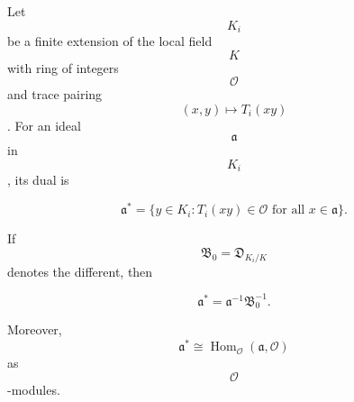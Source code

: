 Let $$K_i$$ be a finite extension of the local field $$K$$ with ring of integers $$\mathcal{O}$$ and trace pairing $$(x,y) \mapsto T_i(xy)$$. For an ideal $$\mathfrak{a}$$ in $$K_i$$, its dual is

$$\mathfrak{a}^* = \{ y \in K_i : T_i(xy) \in \mathcal{O} \text{ for all } x \in \mathfrak{a} \}.$$

If $$\mathfrak{B}_0 = \mathfrak{D}_{K_i/K}$$ denotes the different, then

$$\mathfrak{a}^* = \mathfrak{a}^{-1} \mathfrak{B}_0^{-1}.$$

Moreover, $$\mathfrak{a}^* \cong \operatorname{Hom}_{\mathcal{O}}(\mathfrak{a}, \mathcal{O})$$ as $$\mathcal{O}$$-modules.
